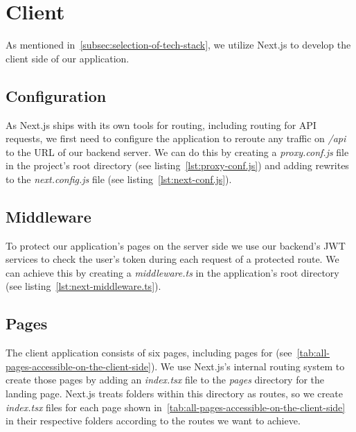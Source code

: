 \section{Client}\label{sec:client}

As mentioned in~\cref{subsec:selection-of-tech-stack}, we utilize Next.js to develop the client side of our application.

\subsection{Configuration}\label{subsec:configuration}

As Next.js ships with its own tools for routing, including routing for \gls{API} requests, we first need to configure the application to reroute any traffic on \emph{/api} to the \gls{URL} of our backend server.
We can do this by creating a \emph{proxy.conf.js} file in the project's root directory (see listing~\ref{lst:proxy-conf.js}) and adding rewrites to the \emph{next.config.js} file (see listing~\ref{lst:next-conf.js}).


\subsection{Middleware}\label{subsec:middleware}

To protect our application's pages on the server side we use our backend's \gls{JWT} services to check the user's token during each request of a protected route.
We can achieve this by creating a \emph{middleware.ts} in the application's root directory (see listing~\ref{lst:next-middleware.ts}).


\subsection{Pages}\label{subsec:pages}


The client application consists of six pages, including pages for  (see~\cref{tab:all-pages-accessible-on-the-client-side}).
We use Next.js's internal routing system to create those pages by adding an \emph{index.tsx} file to the \emph{pages} directory for the landing page.
Next.js treats folders within this directory as routes, so we create \emph{index.tsx} files for each page shown in~\cref{tab:all-pages-accessible-on-the-client-side} in their respective folders according to the routes we want to achieve.

